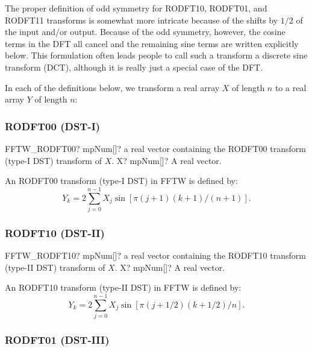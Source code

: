 The proper definition of odd symmetry for RODFT10, RODFT01, and RODFT11 transforms is
somewhat more intricate because of the shifts by $1/2$ of the input and/or output. Because of the odd symmetry, however, the cosine terms in the DFT all cancel and the remaining sine terms are written explicitly below. This formulation often leads people to call such a transform a discrete sine transform (DCT), although it is really just a special case of the DFT.

In each of the definitions below, we transform a real array $X$ of length $n$ to a real array $Y$ of length $n$:


\subsubsection{RODFT00 (DST-I)}

\begin{mpFunctionsExtract}
	\mpFunctionOne
	{FFTW\_RODFT00? mpNum[]? a real vector containing the RODFT00 transform (type-I DST) transform of $X$.}
	{X? mpNum[]? A real vector.}
\end{mpFunctionsExtract}

An RODFT00 transform (type-I DST) in FFTW is defined by:
\begin{equation}
Y_k = 2 \sum^{n-1}_{j=0} X_j \sin[\pi (j+1)(k+1)/(n+1)].
\end{equation}




\subsubsection{RODFT10 (DST-II)}

\begin{mpFunctionsExtract}
	\mpFunctionOne
	{FFTW\_RODFT10? mpNum[]? a real vector containing the RODFT10 transform (type-II DST) transform of $X$.}
	{X? mpNum[]? A real vector.}
\end{mpFunctionsExtract}

An RODFT10 transform (type-II DST) in FFTW is defined by:
\begin{equation}
Y_k = 2 \sum^{n-1}_{j=0} X_j \sin[\pi (j+1/2)(k+1/2)/n].
\end{equation}




\subsubsection{RODFT01 (DST-III)}

